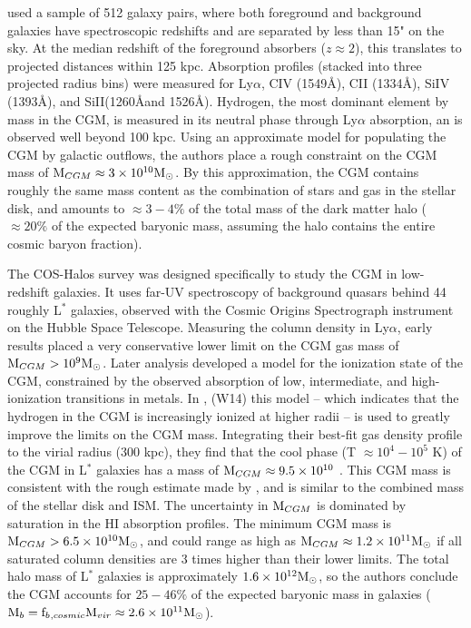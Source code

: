 \textbf{\citet{Steidel2010}} used a sample of 512 galaxy pairs, where
both foreground and background galaxies have spectroscopic redshifts
and are separated by less than 15" on the sky. At the median redshift
of the foreground absorbers ($z\approx 2$), this translates to
projected distances within 125 kpc. Absorption profiles (stacked into
three projected radius bins) were measured for Ly$\alpha$, CIV
(1549\AA), CII (1334\AA), SiIV (1393\AA), and SiII(1260\AA and
1526\AA). Hydrogen, the most dominant element by mass in the CGM, is
measured in its neutral phase through Ly$\alpha$ absorption, an is
observed well beyond 100 kpc. Using an approximate model for
populating the CGM by galactic outflows, the authors place a rough
constraint on the CGM mass of $\textrm{M}{}_{CGM} \approx 3\times 10^{10}
\textrm{M}_\odot{}$. By this approximation, the CGM contains roughly the same
mass content as the combination of stars and gas in the stellar disk,
and amounts to $\approx 3-4\%$ of the total mass of the dark matter
halo ($\approx 20\%$ of the expected baryonic mass, assuming the halo
contains the entire cosmic baryon fraction).

The COS-Halos survey \citep{Tumlinson2011} was designed specifically
to study the CGM in low-redshift galaxies. It uses far-UV spectroscopy
of background quasars behind 44 roughly L$^*$ galaxies, observed with
the Cosmic Origins Spectrograph instrument on the Hubble Space
Telescope. Measuring the column density in Ly$\alpha$, early results
\citep{Thom2012,Werk2013} placed a very conservative lower limit on
the CGM gas mass of $\textrm{M}{}_{CGM} > 10^9 \textrm{M}_\odot{}$. Later analysis
developed a model for the ionization state of the CGM, constrained by
the observed absorption of low, intermediate, and high-ionization
transitions in metals. In \textbf{\citet{Werk2014}}, (W14) this model
-- which indicates that the hydrogen in the CGM is increasingly
ionized at higher radii -- is used to greatly improve the limits on
the CGM mass. Integrating their best-fit gas density profile to the
virial radius (300 kpc), they find that the cool phase (T $\approx
10^4 - 10^5$ K) of the CGM in L$^*$ galaxies has a mass of
$\textrm{M}{}_{CGM} \approx 9.5\times 10^{10}$ \Msun{}. This CGM mass is
consistent with the rough estimate made by \citet{Steidel2010}, and is
similar to the combined mass of the stellar disk and ISM. The
uncertainty in $\textrm{M}{}_{CGM}$ is dominated by saturation in the HI
absorption profiles. The minimum CGM mass is $\textrm{M}{}_{CGM} >
6.5\times 10^{10} \textrm{M}_\odot$, and could range as high as $\textrm{M}{}_{CGM} \approx
1.2\times 10^{11} \textrm{M}_\odot{}$ if all saturated column densities are 3 times
higher than their lower limits. The total halo mass of L$^*$ galaxies
is approximately $1.6\times 10^{12}\textrm{M}_\odot{}$, so the authors conclude the
CGM accounts for $25-46\%$ of the expected baryonic mass in galaxies
($\textrm{M}{}_{b} = \textrm{f\ensuremath{_b}}{}_{,cosmic} \textrm{M\ensuremath{_{vir}}}{} \approx 2.6\times 10^{11}
\textrm{M}_\odot{}$).

